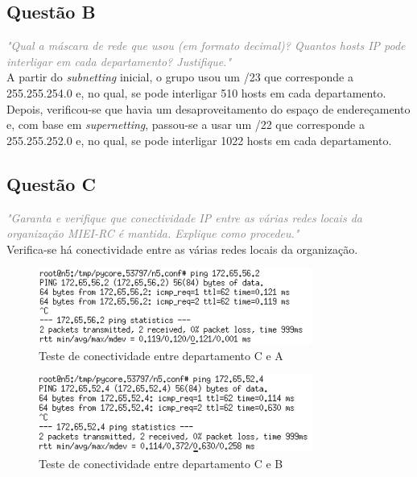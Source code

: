 \documentclass{llncs}
\newcommand{\questionE}[1]{\textcolor{gray}{\textit{"#1"}}}
\begin{document}
\subsection{Questão B}
\hspace{3mm}
\questionE{Qual a máscara de rede que usou (em formato decimal)? Quantos hosts IP pode interligar em cada departamento? Justifique.}\\

A partir do \textit{subnetting} inicial, o grupo usou um /23 que corresponde a 255.255.254.0 e, no qual, se pode interligar 510 hosts em cada departamento.
Depois, verificou-se que havia um desaproveitamento do espaço de endereçamento e, com base em \textit{supernetting}, passou-se a usar um /22 que corresponde a 255.255.252.0 e, no qual, se pode interligar 1022 hosts em cada departamento.

\subsection{Questão C}
\hspace{3mm}
\questionE{Garanta e verifique que conectividade IP entre as várias redes locais da organização	MIEI-RC é mantida. Explique como procedeu.}\\

Verifica-se há conectividade entre as várias redes locais da organização.

\begin{figure}[H]
\begin{center}
\includegraphics[width=9cm]{depCtoDepA.PNG}
\end{center}
\caption{Teste de conectividade entre departamento C e A}
\end{figure}

\begin{figure}[H]
\begin{center}
\includegraphics[width=9cm]{depCtoDepB.PNG}
\end{center}
\caption{Teste de conectividade entre departamento C e B}
\end{figure}
\end{document}

